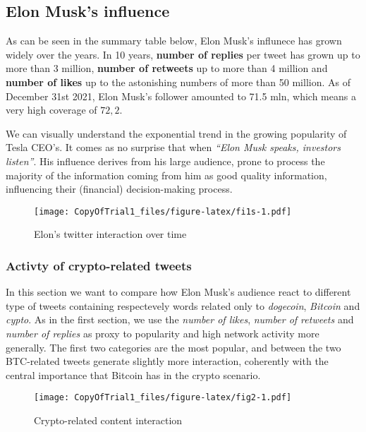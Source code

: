 \documentclass[
]{article}
\begin{document}
\hypertarget{elon-musks-influence}{%
\subsection{Elon Musk's influence}\label{elon-musks-influence}}

As can be seen in the summary table below, Elon Musk's influnece has
grown widely over the years. In 10 years, \textbf{number of replies} per
tweet has grown up to more than 3 million, \textbf{number of retweets}
up to more than 4 million and \textbf{number of likes} up to the
astonishing numbers of more than 50 million. As of December 31st 2021,
Elon Musk's follower amounted to 71.5 mln, which means a very high
coverage of \(72,2%
\).

We can visually understand the exponential trend in the growing
popularity of Tesla CEO's. It comes as no surprise that when
\emph{``Elon Musk speaks, investors listen''}. His influence derives
from his large audience, prone to process the majority of the
information coming from him as good quality information, influencing
their (financial) decision-making process.

\begin{figure}
\centering
\texttt{[image: CopyOfTrial1\_files/figure-latex/fi1s-1.pdf]}
\caption{\label{fig:fig1}Elon's twitter interaction over time}
\end{figure}

\hypertarget{activty-of-crypto-related-tweets}{%
\subsubsection{Activty of crypto-related
tweets}\label{activty-of-crypto-related-tweets}}

In this section we want to compare how Elon Musk's audience react to
different type of tweets containing respectevely words related only to
\emph{dogecoin}, \emph{Bitcoin} and \emph{cypto}. As in the first
section, we use the \emph{number of likes}, \emph{number of retweets}
and \emph{number of replies} as proxy to popularity and high network
activity more generally. The first two categories are the most popular,
and between the two BTC-related tweets generate slightly more
interaction, coherently with the central importance that Bitcoin has in
the crypto scenario.

\begin{figure}
\centering
\texttt{[image: CopyOfTrial1\_files/figure-latex/fig2-1.pdf]}
\caption{\label{fig:fig2}Crypto-related content interaction}
\end{figure}
\end{document}
